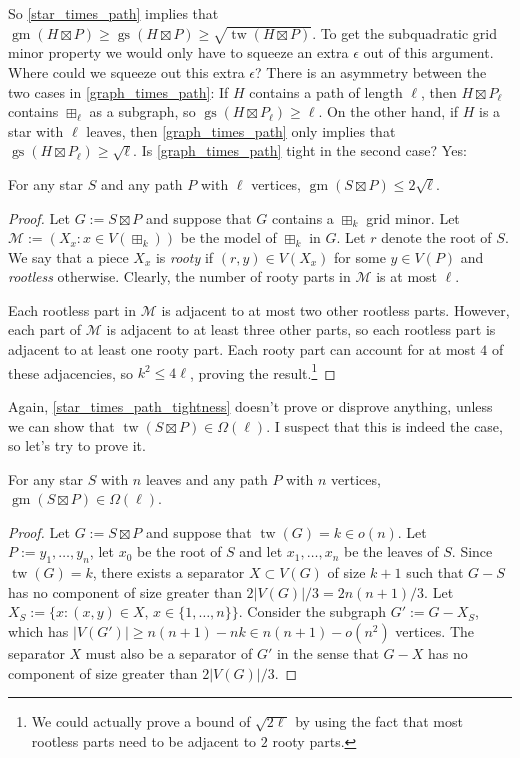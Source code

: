 \documentclass{patmorin}
\DeclareMathOperator{\tw}{tw}
\DeclareMathOperator{\gm}{gm}
\DeclareMathOperator{\gs}{gs}
\begin{document}
So \cref{star_times_path} implies that $\gm(H\boxtimes P)\ge\gs(H\boxtimes P)\ge\sqrt{\tw(H\boxtimes P)}$.  To get the subquadratic grid minor property we would only have to squeeze  an extra $\epsilon$ out of this argument.  Where could we squeeze out this extra $\epsilon$?  There is an asymmetry between the two cases in \cref{graph_times_path}:  If $H$ contains a path of length $\ell$, then $H\boxtimes P_\ell$ contains $\boxplus_\ell$ as a subgraph, so $\gs(H\boxtimes P_\ell)\ge \ell$.  On the other hand, if $H$ is a star with $\ell$ leaves, then \cref{graph_times_path} only implies that $\gs(H\boxtimes P_\ell)\ge \sqrt{\ell}$.  Is \cref{graph_times_path} tight in the second case?  Yes:

\begin{lem}\label{star_times_path_tightness}
    For any star $S$ and any path $P$ with $\ell$ vertices, $\gm(S\boxtimes P)\le 2\sqrt{\ell}$.
\end{lem}

\begin{proof}
    Let $G:=S\boxtimes P$ and suppose that $G$ contains a $\boxplus_k$ grid minor.  Let $\mathcal{M}:=(X_x:x\in V(\boxplus_k))$ be the model of $\boxplus_k$ in $G$.  Let $r$ denote the root of $S$.  We say that a piece $X_x$ is \emph{rooty} if $(r,y)\in V(X_x)$ for some $y\in V(P)$ and \emph{rootless} otherwise.  Clearly, the number of rooty parts in $\mathcal{M}$ is at most $\ell$.

    Each rootless part in $\mathcal{M}$ is adjacent to at most two other rootless parts.  However, each part of $\mathcal{M}$ is adjacent to at least three other parts, so each rootless part is adjacent to at least one rooty part.  Each rooty part can account for at most $4$ of these adjacencies, so $k^2 \le 4\ell$, proving the result.\footnote{We could actually prove a bound of $\sqrt{2\ell}$ by using the fact that most rootless parts need to be adjacent to $2$ rooty parts.}
\end{proof}

Again, \cref{star_times_path_tightness} doesn't prove or disprove anything, unless we can show that $\tw(S\boxtimes P)\in \Omega(\ell)$.  I suspect that this is indeed the case, so let's try to prove it.

\begin{lem}
    For any star $S$ with $n$ leaves and any path $P$ with $n$ vertices, $\gm(S\boxtimes P)\in\Omega(\ell)$.
\end{lem}

\begin{proof}
    Let $G:=S\boxtimes P$ and suppose that $\tw(G)=k\in o(n)$.  Let $P:=y_1,\ldots,y_n$, let $x_0$ be the root of $S$ and let $x_1,\ldots,x_n$ be the leaves of $S$. Since $\tw(G)=k$, there exists a separator $X\subset V(G)$ of size $k+1$ such that $G-S$ has no component of size greater than $2|V(G)|/3=2n(n+1)/3$.  Let $X_S:=\{x:(x,y)\in X,\, x\in\{1,\ldots,n\}\}$.  Consider the subgraph $G':=G-X_S$, which has $|V(G')|\ge n(n+1)-nk \in n(n+1)-o(n^2)$ vertices.  The separator $X$ must also be a separator of $G'$ in the sense that $G-X$ has no component of size greater than $2|V(G)|/3$.  


\end{proof}







\end{document}
